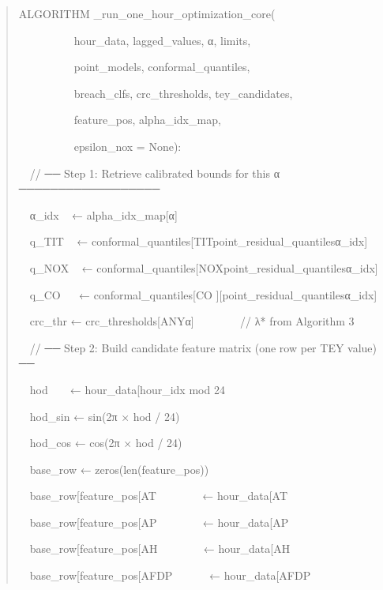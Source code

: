 \documentclass[11pt]{article}
\begin{document}
\begin{quote}
ALGORITHM \_run\_one\_hour\_optimization\_core(

~~~~~~~~~~hour\_data, lagged\_values, α, limits,

~~~~~~~~~~point\_models, conformal\_quantiles,

~~~~~~~~~~breach\_clfs, crc\_thresholds, tey\_candidates,

~~~~~~~~~~feature\_pos, alpha\_idx\_map,

~~~~~~~~~~epsilon\_nox = None):

~~// ── Step 1: Retrieve calibrated bounds for this α ──────────────────

~~α\_idx ~ ← alpha\_idx\_map{[}α{]}

~~q\_TIT ~ ←
conformal\_quantiles{[}\textquotesingle TIT\textquotesingle{]}{[}\textquotesingle point\_residual\_quantiles\textquotesingle{]}{[}α\_idx{]}

~~q\_NOX ~ ←
conformal\_quantiles{[}\textquotesingle NOX\textquotesingle{]}{[}\textquotesingle point\_residual\_quantiles\textquotesingle{]}{[}α\_idx{]}

~~q\_CO~ ~ ←
conformal\_quantiles{[}\textquotesingle CO\textquotesingle{}
{]}{[}\textquotesingle point\_residual\_quantiles\textquotesingle{]}{[}α\_idx{]}

~~crc\_thr ←
crc\_thresholds{[}\textquotesingle ANY\textquotesingle{]}{[}α{]}~ ~ ~ ~
~ // λ* from Algorithm 3

~~// ── Step 2: Build candidate feature matrix (one row per TEY value)
──

~~hod ~ ~ ← hour\_data{[}\textquotesingle hour\_idx\textquotesingle{]}
mod 24

~~hod\_sin ← sin(2π × hod / 24)

~~hod\_cos ← cos(2π × hod / 24)

~~base\_row ← zeros(len(feature\_pos))

~~base\_row{[}feature\_pos{[}\textquotesingle AT\textquotesingle{]}{]}~
~ ~ ~ ~ ← hour\_data{[}\textquotesingle AT\textquotesingle{]}

~~base\_row{[}feature\_pos{[}\textquotesingle AP\textquotesingle{]}{]}~
~ ~ ~ ~ ← hour\_data{[}\textquotesingle AP\textquotesingle{]}

~~base\_row{[}feature\_pos{[}\textquotesingle AH\textquotesingle{]}{]}~
~ ~ ~ ~ ← hour\_data{[}\textquotesingle AH\textquotesingle{]}

~~base\_row{[}feature\_pos{[}\textquotesingle AFDP\textquotesingle{]}{]}~
~ ~ ~ ← hour\_data{[}\textquotesingle AFDP\textquotesingle{]}


\end{quote}
\end{document}
